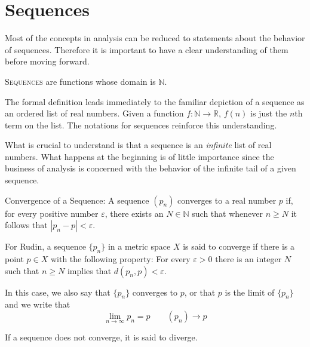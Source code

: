 
\section{Sequences}

Most of the concepts in analysis can be reduced to statements about the behavior of sequences.  Therefore it is important to have a clear understanding of them before moving forward.




\begin{definition}\textsc{Sequences} are functions whose domain is $\mathbb{N}$.  \end{definition}

The formal definition leads immediately to the familiar depiction of a sequence as an ordered list of real numbers.  Given a function $f: \mathbb{N} \to \mathbb{R}$,   $f(n)$ is just the $n$th term on the list.  The notations for sequences reinforce this understanding.

What is crucial to understand is that a sequence is an \emph{infinite} list of real numbers.  What happens at the beginning is of little importance since the business of analysis is concerned with the behavior of the infinite tail of a given sequence.  

\begin{definition}Convergence of a Sequence:  A sequence $(p_n)$ converges to a real number $p$ if, for every positive number $\varepsilon$, there exists an $N \in \mathbb{N}$ such that whenever $n \geq N$ it follows that $|p_n - p|< \varepsilon$. \end{definition}


For Rudin, a sequence $\{p_n\}$ in a metric space $X$ is said to converge if there is a point $p \in X$ with the following property:  For every $\varepsilon > 0$ there is an integer $N$ such that $n \geq N$ implies that $d(p_n, p) < \varepsilon$.

In this case, we also say that  $\{p_n\}$ converges to $p$, or that $p$ is the limit of  $\{p_n\}$ and we write that 
\[\lim_{n \to \infty} p_n = p   \qquad (p_n) \to p\]


If a sequence does not converge, it is said to diverge.  


